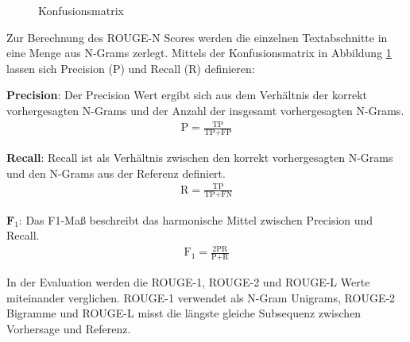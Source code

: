 \begin{figure}[h!]
    \centering
{}
\caption{Konfusionsmatrix}
\label{confusionmatrix}
\end{figure}
Zur Berechnung des ROUGE-N Scores werden die einzelnen Textabschnitte in eine Menge aus N-Grams zerlegt.
Mittels der Konfusionsmatrix in Abbildung \ref{confusionmatrix} lassen sich Precision (P) und Recall (R) definieren:
\begin{addmargin}[30pt]{30pt}
    \textbf{Precision}: 
    Der Precision Wert ergibt sich aus dem Verhältnis der korrekt vorhergesagten N-Grams und der Anzahl der insgesamt vorhergesagten N-Grams.
    \begin{align*}
    \text{P} = \frac{\text{TP}}{\text{TP}+\text{FP}}
    \end{align*}

    \textbf{Recall}:
    Recall ist als Verhältnis zwischen den korrekt vorhergesagten N-Grams und den N-Grams aus der Referenz definiert.
    \begin{align*}
    \text{R} = \frac{\text{TP}}{\text{TP}+\text{FN}}
    \end{align*}

    $\textbf{F}_1$:
    Das F1-Maß beschreibt das harmonische Mittel zwischen Precision und Recall.
    \begin{align*}
    \text{F}_{1} = \frac{2\text{PR}}{\text{P}+\text{R}}
    \end{align*}
\end{addmargin}

In der Evaluation werden die ROUGE-1, ROUGE-2 und ROUGE-L Werte miteinander verglichen.
ROUGE-1 verwendet als N-Gram Unigrams, ROUGE-2 Bigramme und ROUGE-L misst die längste gleiche Subsequenz zwischen Vorhersage und Referenz.

